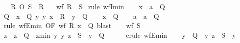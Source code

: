 \begin{isabellebody}
\ \ \ {\isachardoublequoteopen}R\ O\ S\ {\isasymsubseteq}\ R{\isachardoublequoteclose}\isanewline
\ \ \ {\isachardoublequoteopen}wf\ {\isacharparenleft}{\kern0pt}R\ {\isasymunion}\ S{\isacharparenright}{\kern0pt}{\isachardoublequoteclose}\isanewline
%
\isadelimproof
%
\endisadelimproof
%
\isatagproof
{}\isamarkupfalse%
\ {\isacharparenleft}{\kern0pt}rule\ wfI{\isacharunderscore}{\kern0pt}min{\isacharparenright}{\kern0pt}\isanewline
\ \ \isamarkupfalse%
\ x\ {\isacharcolon}{\kern0pt}{\isacharcolon}{\kern0pt}\ {\isacharprime}{\kern0pt}a\ \ Q\isanewline
\ \ \isamarkupfalse%
\ {\isacharquery}{\kern0pt}Q{\isacharprime}{\kern0pt}\ {\isacharequal}{\kern0pt}\ {\isachardoublequoteopen}{\isacharbraceleft}{\kern0pt}x\ {\isasymin}\ Q{\isachardot}{\kern0pt}\ {\isasymforall}y{\isachardot}{\kern0pt}\ {\isacharparenleft}{\kern0pt}y{\isacharcomma}{\kern0pt}\ x{\isacharparenright}{\kern0pt}\ {\isasymin}\ R\ {\isasymlongrightarrow}\ y\ {\isasymnotin}\ Q{\isacharbraceright}{\kern0pt}{\isachardoublequoteclose}\isanewline
\ \ \isamarkupfalse%
\ {\isachardoublequoteopen}x\ {\isasymin}\ Q{\isachardoublequoteclose}\isanewline
\ \ \isamarkupfalse%
\ a\ \ {\isachardoublequoteopen}a\ {\isasymin}\ {\isacharquery}{\kern0pt}Q{\isacharprime}{\kern0pt}{\isachardoublequoteclose}\isanewline
\ \ \ \ \isamarkupfalse%
\ {\isacharparenleft}{\kern0pt}rule\ wfE{\isacharunderscore}{\kern0pt}min\ {\isacharbrackleft}{\kern0pt}OF\ {\isacartoucheopen}wf\ R{\isacartoucheclose}\ {\isacartoucheopen}x\ {\isasymin}\ Q{\isacartoucheclose}{\isacharbrackright}{\kern0pt}{\isacharparenright}{\kern0pt}\ blast\isanewline
\ \ \isamarkupfalse%
\ {\isacartoucheopen}wf\ S{\isacartoucheclose}\ \isamarkupfalse%
\ z\ \ {\isachardoublequoteopen}z\ {\isasymin}\ {\isacharquery}{\kern0pt}Q{\isacharprime}{\kern0pt}{\isachardoublequoteclose}\ \ zmin{\isacharcolon}{\kern0pt}\ {\isachardoublequoteopen}{\isasymAnd}y{\isachardot}{\kern0pt}\ {\isacharparenleft}{\kern0pt}y{\isacharcomma}{\kern0pt}\ z{\isacharparenright}{\kern0pt}\ {\isasymin}\ S\ {\isasymLongrightarrow}\ y\ {\isasymnotin}\ {\isacharquery}{\kern0pt}Q{\isacharprime}{\kern0pt}{\isachardoublequoteclose}\isanewline
\ \ \ \ \isamarkupfalse%
\ {\isacharparenleft}{\kern0pt}erule\ wfE{\isacharunderscore}{\kern0pt}min{\isacharparenright}{\kern0pt}\isanewline
\ \ \isamarkupfalse%
\ {\isachardoublequoteopen}y\ {\isasymnotin}\ Q{\isachardoublequoteclose}\ \ {\isachardoublequoteopen}{\isacharparenleft}{\kern0pt}y{\isacharcomma}{\kern0pt}\ z{\isacharparenright}{\kern0pt}\ {\isasymin}\ S{\isachardoublequoteclose}\ \ y\isanewline

\end{isabellebody}
